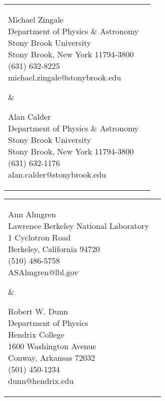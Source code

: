 \documentclass[10pt]{article}
\begin{document}
\newlength{\collength}\setlength{\collength}{3.50in}%
\newlength{\spacewidthB}\setlength{\spacewidthB}{5pt}
%
\vspace{0.05in}
\begin{tabular}[t]{@{}p{\collength-\spacewidthB}@{}p{\collength}}%
%
\parbox{\collength-\spacewidthB}{%
Michael Zingale \\
Department of Physics \& Astronomy \\
Stony Brook University \\
Stony Brook, New York 11794-3800 \\
(631) 632-8225 \\
michael.zingale@stonybrook.edu } &
%
\parbox{\collength}{%
Alan Calder \\
Department of Physics \& Astronomy \\
Stony Brook University \\
Stony Brook, New York 11794-3800 \\
(631) 632-1176 \\
alan.calder@stonybrook.edu }

\end{tabular}

\vspace{0.1in}

\begin{tabular}[t]{@{}p{\collength-\spacewidthB}@{}p{\collength}}%
%
\parbox{\collength-\spacewidthB}{%
Ann Almgren \\
Lawrence Berkeley National Laboratory \\
1 Cyclotron Road \\
Berkeley, California 94720 \\
(510) 486-5758 \\
ASAlmgren@lbl.gov } &
%
\parbox{\collength}{%
Robert W. Dunn \\
Department of Physics \\
Hendrix College \\
1600 Washington Avenue \\
Conway, Arkansas 72032 \\
(501) 450-1234 \\
dunn@hendrix.edu
}

\end{tabular}
\end{document}
